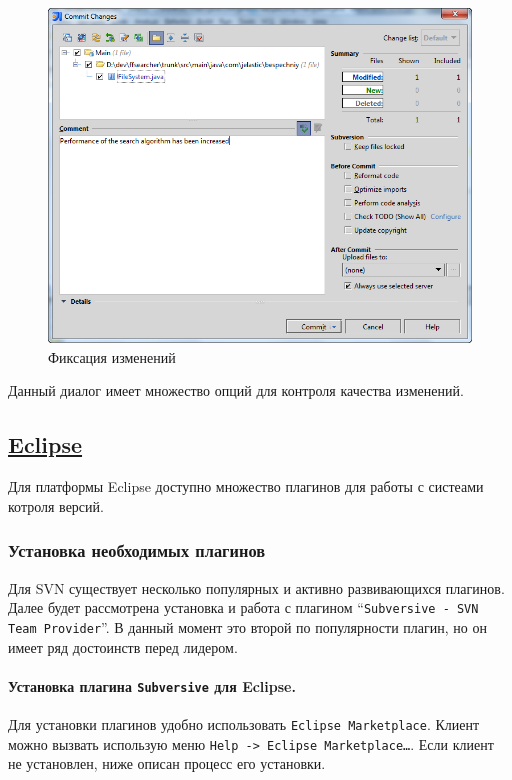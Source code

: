 \documentclass[a4paper,12pt]{article}
\begin{document}
\begin{figure}[h!]
	\centering
	\includegraphics[scale=0.60]{intellij-idea-17.png}
	\vspace{-10pt}
	\caption{Фиксация изменений}
\end{figure}
Данный диалог имеет множество опций для контроля качества изменений.

\subsection{\href{http://www.eclipse.org/}{Eclipse}}
\setcounter{figure}{0}
Для платформы Eclipse доступно множество плагинов для работы с
систеами котроля версий.
\subsubsection{Установка необходимых плагинов}

Для SVN существует несколько популярных и активно развивающихся плагинов. Далее
будет рассмотрена установка и работа с плагином ``\texttt{Subversive - SVN Team
Provider}''. В данный момент это второй по популярности плагин, но он имеет ряд
достоинств перед лидером.

\paragraph{Установка плагина \texttt{Subversive} для Eclipse.}
Для установки плагинов удобно использовать \texttt{Eclipse Marketplace}. Клиент
можно вызвать использую меню \texttt{Help -\textgreater{} Eclipse
Marketplace\ldots}. Если клиент не установлен, ниже описан процесс его
установки.
\end{document}

